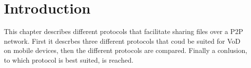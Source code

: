 \section{Introduction}
This chapter describes different protocols that facilitate sharing files over a P2P network. First it descrbes three different protocols that coud be suited for VoD on mobile devices, then the different protocols are compared. Finally a conlusion, to which protocol is best suited, is reached.